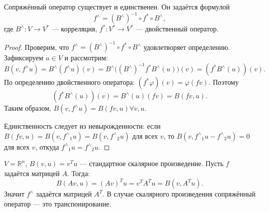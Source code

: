 \begin{stmt}
    Сопряжённый оператор существует и единственен. Он задаётся формулой
    \[
        f^{\wedge} = (B^{\wedge})^{-1} \circ f^* \circ B^{\wedge},
    \]
    где $B^{\wedge} \colon V \to V^*$ --- корреляция, $f^* \colon V^* \to V^*$ --- двойственный оператор.
    \begin{proof}
        Проверим, что $f^{\wedge} = (B^{\wedge})^{-1} \circ f^* \circ B^{\wedge}$ удовлетворяет определению.
        Зафиксируем $u \in V$ и рассмотрим:
        \[
            B(v, f^{\wedge} u) = B^{\wedge}(f^{\wedge} u)(v) = B^{\wedge}\bigl((B^{\wedge})^{-1} f^* B^{\wedge}
            (u)\bigr)(v) = (f^* B^{\wedge}(u))(v).
        \]
        По определению двойственного оператора: $(f^* \varphi)(v) = \varphi(fv)$. Поэтому
        \[
            (f^* B^{\wedge}(u))(v) = B^{\wedge}(u)(fv) = B(fv, u).
        \]
        Таким образом, $B(v, f^{\wedge}u) = B(fv, u) \forall v, u$.

        Единственность следует из невырожденности:
        если $B(fv, u) = B(v, {f^{\wedge}}_1 u) = B(v, {f^{\wedge}}_2 u)$ для всех $v$,
        то $B(v, {f^{\wedge}}_1 u - {f^{\wedge}}_2 u) = 0$ для всех $v$, откуда ${f^{\wedge}}_1 u = {f^{\wedge}}_2 u$.
    \end{proof}
\end{stmt}


\begin{example}
    $V = \mathbb{R}^n$, $B(v, u) = v^T u$ --- стандартное скалярное произведение. Пусть $f$ задаётся матрицей
    $A$. Тогда:
    \[
        B(Av, u) = (Av)^T u = v^T A^T u = B(v, A^T u).
    \]
    Значит $f^{\wedge}$ задаётся матрицей $A^T$. В случае скалярного произведения сопряжённый оператор --- это транспонирование.
\end{example}
